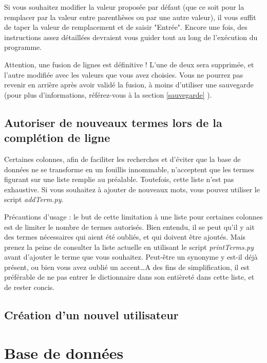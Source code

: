 \documentclass[12pt,a4paper]{article}
\begin{document}
        Si vous souhaitez modifier la valeur proposée par défaut (que ce soit pour la remplacer par la valeur
        entre parenthèses ou par une autre valeur), il vous suffit de taper la valeur de remplacement et de saisir
        "Entrée". Encore une fois, des instructions assez détaillées devraient vous guider
        tout au long de l'exécution du programme.

        Attention, une fusion de lignes est définitive ! L'une de deux sera supprimée, et l'autre modifiée avec les
        valeurs que vous avez choisies. Vous ne pourrez pas revenir en arrière après avoir validé la fusion,
        à moins d'utiliser une sauvegarde (pour plus d'informations, référez-vous à 
        la section \ref{sauvegarde} ).


    \bigskip


    \subsection{Autoriser de nouveaux termes lors de la complétion de ligne}\label{newterms}
        Certaines colonnes, afin de faciliter les recherches et d'éviter que la base
        de données ne se transforme en un fouillis innommable, n'acceptent que les termes
        figurant sur une liste remplie au préalable. Toutefois, cette liste n'est pas
        exhaustive. Si vous souhaitez à ajouter de nouveaux mots, vous pouvez utiliser
        le script \emph{addTerm.py}.

        Précautions d'usage : le but de cette limitation à une liste pour certaines colonnes
        est de limiter le nombre de termes autorisés. Bien entendu, il se peut qu'il y ait des
        termes nécessaires qui aient été oubliés, et qui doivent être ajoutés.
        Mais prenez la peine de consulter la liste actuelle en utilisant le script \emph{printTerms.py}
        avant d'ajouter le terme que vous souhaitez.
        Peut-être un synonyme y est-il déjà présent, ou bien vous avez
        oublié un accent\dots A des fins de simplification, il est préférable de ne pas entrer
        le dictionnaire dans son entièreté dans cette liste, et de rester concis.




    \subsection{Création d'un nouvel utilisateur}


\clearpage
\section{Base de données}
\end{document}
